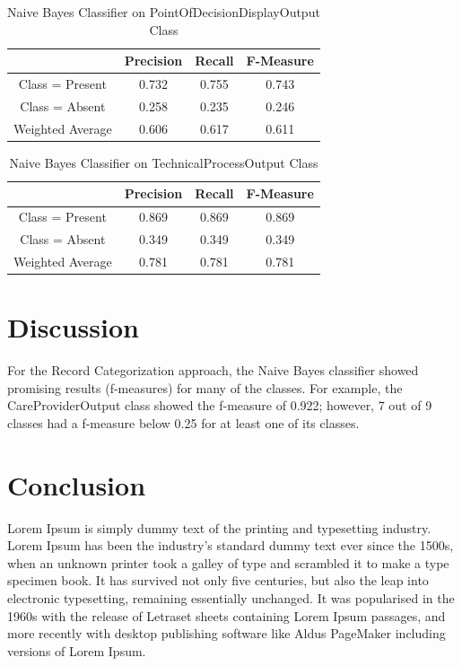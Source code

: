 \documentclass[11pt, notitlepage,abstracton,oneside]{article}   	%
\begin{document}
\begin{table}[htdp]
\caption{Naive Bayes Classifier on PointOfDecisionDisplayOutput Class}
\begin{center}
\begin{tabular}{|c|c|c|c|}
\hline
& Precision & Recall & F-Measure \\ \hline
Class = Present & 0.732 & 0.755 & 0.743 \\ \hline
Class = Absent & 0.258 & 0.235 & 0.246 \\ \hline
Weighted Average & 0.606 & 0.617 & 0.611 \\ \hline
\end{tabular}
\end{center}
\label{default}
\end{table}%

\begin{table}[htdp]
\caption{Naive Bayes Classifier on TechnicalProcessOutput Class}
\begin{center}
\begin{tabular}{|c|c|c|c|}
\hline
& Precision & Recall & F-Measure \\ \hline
Class = Present & 0.869 & 0.869 & 0.869 \\ \hline
Class = Absent & 0.349 & 0.349 & 0.349 \\ \hline
Weighted Average & 0.781 & 0.781 & 0.781 \\ \hline
\end{tabular}
\end{center}
\label{default}
\end{table}%

\section{Discussion}

For the Record Categorization approach, the Naive Bayes classifier showed promising results (f-measures) for many of the classes. For example, the CareProviderOutput class showed the f-measure of 0.922; however, 7 out of 9 classes had a f-measure below 0.25 for at least one of its classes.

\section{Conclusion}
Lorem Ipsum is simply dummy text of the printing and typesetting industry. Lorem Ipsum has been the industry's standard dummy text ever since the 1500s, when an unknown printer took a galley of type and scrambled it to make a type specimen book. It has survived not only five centuries, but also the leap into electronic typesetting, remaining essentially unchanged. It was popularised in the 1960s with the release of Letraset sheets containing Lorem Ipsum passages, and more recently with desktop publishing software like Aldus PageMaker including versions of Lorem Ipsum.
\end{document}
